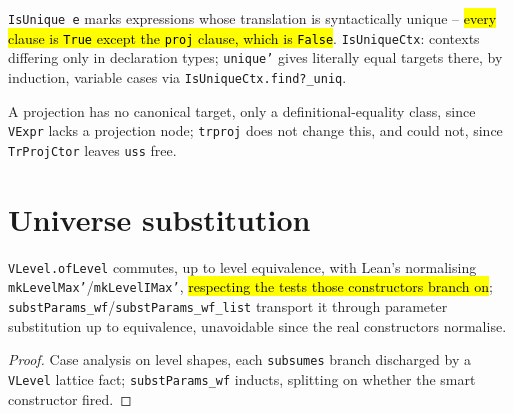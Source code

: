 \begin{definition}
\label{def:trexprs-isunique}
\leanok
{}
 \texttt{IsUnique e} marks expressions whose translation is syntactically unique -- \hl{every clause is \texttt{True} except the \texttt{proj} clause, which is \texttt{False}}. \texttt{IsUniqueCtx}: contexts differing only in declaration types; \texttt{unique'} gives literally equal targets there, by induction, variable cases via \texttt{IsUniqueCtx.find?\_uniq}.
\end{definition}

\begin{remark}
 A projection has no canonical target, only a definitional-equality class, since \texttt{VExpr} lacks a projection node; \texttt{trproj} does not change this, and could not, since \texttt{TrProjCtor} leaves \texttt{uss} free.
\end{remark}

\section{Universe substitution}

\begin{lemma}
\label{family:vt-oflevel}
\leanok
{}
 \texttt{VLevel.ofLevel} commutes, up to level equivalence, with Lean's normalising \texttt{mkLevelMax'}/\texttt{mkLevelIMax'}, \hl{respecting the tests those constructors branch on}; \texttt{substParams\_wf}/\texttt{substParams\_wf\_list} transport it through parameter substitution up to equivalence, unavoidable since the real constructors normalise.
\end{lemma}
\begin{proof}
\leanok
{} Case analysis on level shapes, each \texttt{subsumes} branch discharged by a \texttt{VLevel} lattice fact; \texttt{substParams\_wf} inducts, splitting on whether the smart constructor fired.
\end{proof}

